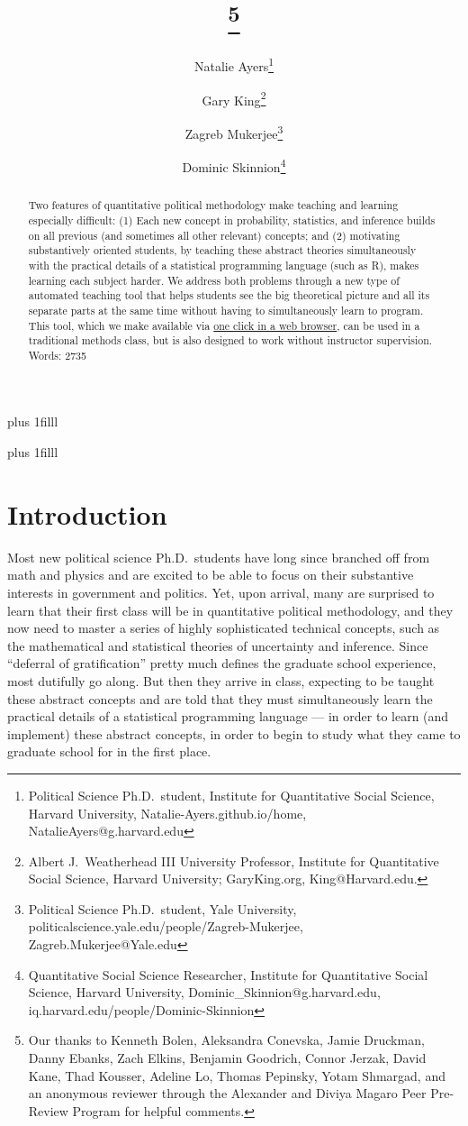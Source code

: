 \documentclass[12pt]{article}
\title{\titl}
\title{\titl\thanks{Our thanks to Kenneth Bolen, Aleksandra Conevska, Jamie Druckman, Danny Ebanks, Zach Elkins, Benjamin Goodrich, Connor Jerzak, David Kane, Thad Kousser, Adeline Lo, Thomas Pepinsky, Yotam Shmargad, and an anonymous reviewer through the Alexander and Diviya Magaro Peer Pre-Review Program for helpful comments.}}
\author{Natalie Ayers\thanks{Political Science Ph.D.\ student, Institute for Quantitative Social Science, Harvard University, Natalie-Ayers.github.io/home, NatalieAyers@g.harvard.edu}\and Gary King\thanks{Albert J.\ Weatherhead
III University Professor, Institute for Quantitative Social
Science, Harvard University; GaryKing.org, King@Harvard.edu.}\and Zagreb Mukerjee\thanks{Political Science Ph.D.\ student, Yale University, politicalscience.yale.edu/people/Zagreb-Mukerjee, Zagreb.Mukerjee@Yale.edu} \and Dominic Skinnion\thanks{Quantitative Social Science Researcher, Institute for Quantitative Social Science, Harvard University, Dominic\_Skinnion@g.harvard.edu, iq.harvard.edu/people/Dominic-Skinnion}}
\newcommand{\btVFill}{\vskip0pt plus 1filll}
\theoremstyle{definition}
\begin{document}
\maketitle\thispagestyle{empty}\setcounter{page}{0}
\btVFill
\vspace{-2\baselineskip}
\begin{abstract}
  \noindent Two features of quantitative political methodology make teaching and learning especially difficult: (1) Each new concept in probability, statistics, and inference builds on all previous (and sometimes all other relevant) concepts; and (2) motivating substantively oriented students, by teaching these abstract theories simultaneously with the practical details of a statistical programming language (such as R), makes learning each subject harder. We address both problems through a new type of automated teaching tool that helps students see the big theoretical picture and all its separate parts at the same time without having to simultaneously learn to program. This tool, which we make available via \href{https://2k1.iq.harvard.edu}{one click in a web browser}, can be used in a traditional methods class, but is also designed to work without instructor supervision.
  \\
  \newline
  \noindent Words: 2735
\end{abstract}
\btVFill
\clearpage
{}\baselineskip

\section{Introduction}\label{s:intro}

Most new political science Ph.D.\ students have long since branched off from math and physics and are excited to be able to focus on their substantive interests in government and politics. Yet, upon arrival, many are surprised to learn that their first class will be in quantitative political methodology, and they now need to master a series of highly sophisticated technical concepts, such as the mathematical and statistical theories of uncertainty and inference. Since ``deferral of gratification'' pretty much defines the graduate school experience, most dutifully go along. But then they arrive in class, expecting to be taught these abstract concepts and are told that they must simultaneously learn the practical details of a statistical programming language --- in order to learn (and implement) these abstract concepts, in order to begin to study what they came to graduate school for in the first place.
\end{document}
